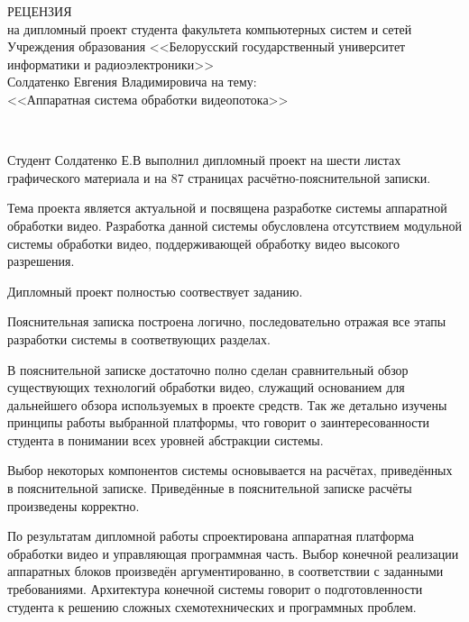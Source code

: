 \thispagestyle{empty}

\begin{singlespace}

{\small
  \begin{center}
    \begin{minipage}{0.9\textwidth}
      \begin{center}
        {\normalsize РЕЦЕНЗИЯ}\\[0.2cm]
        на дипломный проект студента факультета компьютерных систем и сетей
        Учреждения образования <<Белорусский государственный университет информатики и радиоэлектроники>>\\
        Солдатенко Евгения Владимировича на тему: \\
        <<Аппаратная система обработки видеопотока>>
      \end{center}
    \end{minipage}\\
  \end{center}

Студент Солдатенко Е.В выполнил дипломный проект на шести листах графического материала
и на 87 страницах расчётно-пояснительной записки.

Тема проекта является актуальной и посвящена разработке системы аппаратной обработки видео.
Разработка данной системы обусловлена отсутствием модульной системы обработки видео,
поддерживающей обработку видео высокого разрешения.

Дипломный проект полностью соотвествует заданию.

Пояснительная записка построена логично, последовательно отражая все этапы разработки
системы в соответвующих разделах.

В пояснительной записке достаточно полно сделан сравнительный обзор существующих технологий
обработки видео, служащий основанием для дальнейшего обзора используемых в проекте средств.
Так же детально изучены принципы работы выбранной платформы, что говорит о заинтересованности
студента в понимании всех уровней абстракции системы.

Выбор некоторых компонентов системы основывается на расчётах, приведённых в пояснительной записке.
Приведённые в пояснительной записке расчёты произведены корректно.

По результатам дипломной работы спроектирована аппаратная платформа обработки видео и управляющая
программная часть. Выбор конечной реализации аппаратных блоков произведён аргументированно, в соответствии
с заданными требованиями. Архитектура конечной системы говорит о подготовленности студента к решению
сложных схемотехнических и программных проблем.

}
\end{singlespace}
